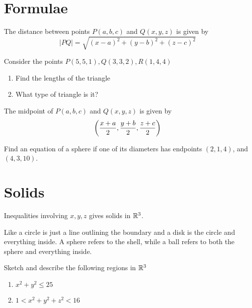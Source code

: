 \documentclass[twoside]{report}
\begin{document}
    \section{Formulae}
    \begin{definition}
        The distance between points $P(a, b, c)$ and $Q(x, y, z)$ is given by
        \begin{equation}
            |PQ| = \sqrt{(x - a)^{2} + (y - b)^{2} + (z - c)^{2}}
        \end{equation}
    \end{definition}
    \begin{example}
        Consider the points $P(5,5,1),Q(3,3,2),R(1,4,4)$
        \begin{enumerate}
            \item Find the lengths of the triangle
            \item What type of triangle is it?
        \end{enumerate}
    \end{example}
    \begin{definition}
        The midpoint of $P(a, b, c)$ and $Q(x, y, z)$ is given by
        \begin{equation}
            \bigg(\frac{x + a}{2},\frac{y + b}{2},\frac{z + c}{2}\bigg)
        \end{equation}
    \end{definition}
    \begin{example}
        Find an equation of a sphere if one of its diameters has endpoints $(2,1,4)$, and $(4,3,10)$.
    \end{example}
    \section{Solids}
    \begin{definition}[Solids]
        Inequalities involving $x, y, z$ gives solids in $\mathbb{R}^{3}$.
    \end{definition}
    Like a circle is just a line outlining the boundary and a disk is the circle and everything inside. A sphere refers to the shell, while a ball refers to both the sphere and everything inside.

    \begin{example}
        Sketch and describe the following regions in $\mathbb{R}^{3}$
        \begin{enumerate}
            \item $x^{2} + y^{2} \leq 25$
            \item $1 < x^{2} + y^{2} + z^{2} < 16$
        \end{enumerate}
    \end{example}
\end{document}
